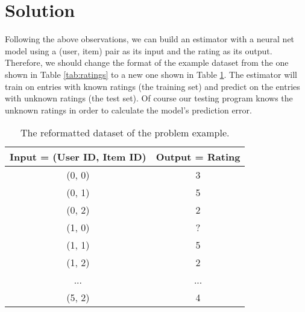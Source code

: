 \documentclass[conference]{IEEEtran}
\begin{document}
\section{Solution}
Following the above observations, we can build an estimator with a neural net 
model using a (user, item) pair as its input and the rating as its output.
Therefore, we should change the format of the example dataset from the one 
shown in Table \ref{tab:ratings} to a new one shown in Table \ref{tab:rating}.
The estimator will train on entries with known ratings (the training set) 
and predict on the entries with unknown ratings (the test set).
Of course our testing program knows the unknown ratings in order to calculate 
the model's prediction error.
\begin{table}[!ht]
	\centering
	\caption{The reformatted dataset of the problem example.}
	\begin{tabular}{cc}  \hline
		Input = (User ID, Item ID) & Output = Rating \\ \hline
		(0, 0)                     & 3 \\ \hline
		(0, 1)                     & 5 \\ \hline
		(0, 2)                     & 2 \\ \hline
		(1, 0)                     & ? \\ \hline
		(1, 1)                     & 5 \\ \hline
		(1, 2)                     & 2 \\ \hline
		...                        & ... \\ \hline
		(5, 2)                     & 4 \\ \hline
	\end{tabular}
	\label{tab:rating}
\end{table}
\end{document}
